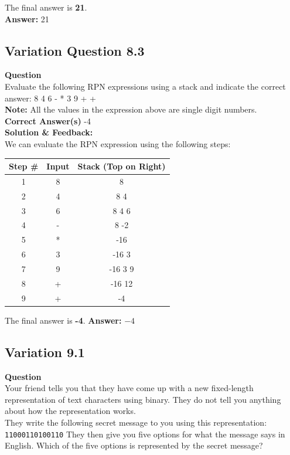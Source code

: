 The final answer is \textbf{21}. \\
\textbf{Answer:} 21 \\

\subsection{Variation Question 8.3}
\textbf{Question} \\ 
Evaluate the following RPN expressions using a stack and indicate the correct answer:
8 4 6 - * 3 9 + + \\
\textbf{Note:} All the values in the expression above are single digit numbers. \\ 
\textbf{Correct Answer(s)}
-4 \\
\textbf{Solution \& Feedback:} \\ 
We can evaluate the RPN expression using the following steps: \\
\begin{tabular}{|c|c|c|}
\hline
\textbf{Step \#} & \textbf{Input} & \textbf{Stack (Top on Right)} \\ \hline
1 & 8 & 8 \\ \hline
2 & 4 & 8 4 \\ \hline
3 & 6 & 8 4 6 \\ \hline
4 & - & 8 -2 \\ \hline
5 & * & -16 \\ \hline
6 & 3 & -16 3 \\ \hline
7 & 9 & -16 3 9 \\ \hline
8 & + & -16 12 \\ \hline
9 & + & -4 \\ \hline
\end{tabular}

The final answer is \textbf{-4}.
\textbf{Answer:} $-4$

\subsection{Variation 9.1}
\textbf{Question} \\
Your friend tells you that they have come up with a new fixed-length representation of text characters using binary. They do not tell you anything about how the representation works.\\
They write the following secret message to you using this representation: \\
\texttt{11000110100110}
They then give you five options for what the message says in English. Which of the five options is represented by the secret message?

